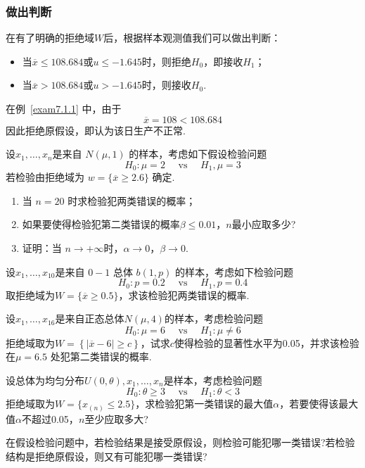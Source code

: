 \subsubsection{做出判断}

在有了明确的拒绝域$W$后，根据样本观测值我们可以做出判断：
\begin{itemize}
	\item 当$\overline{x}\leq 108.684$或$u\leq -1.645$时，则拒绝$H_{0}$，即接收$H_{1}$；
	\item 当$\overline{ x }>108.684$或$u> -1.645$时，则接收$H_{0}$.
\end{itemize}

在例~\ref{exam7.1.1} 中，由于
\[\overline { x } = 108 < 108.684\]
因此拒绝原假设，即认为该日生产不正常.
\begin{xiti}
	\item 设$x_1,\dotsc ,x_n$是来自 $N(\mu ,1)$ 的样本，考虑如下假设检验问题
	\[H _ { 0 } : \mu = 2 \quad \text { vs } \quad H _ { 1 } , \mu = 3\]
	若检验由拒绝域为 $w = \{ \overline { x } \geq 2.6 \}$ 确定.
	\begin{enumerate}
		\item 当 $n=20$ 时求检验犯两类错误的概率；
		\item 如果要使得检验犯第二类错误的概率$\beta \leq 0.01$，$n$最小应取多少?
		
		\item 证明：当 $n\rightarrow +\infty $时，$\alpha \rightarrow  0$，$\beta \rightarrow  0$.
	\end{enumerate}
	\item 设$x_1,\dotsc ,x_{10}$是来自 $0-1$ 总体 $b(1,p)$ 的样本，考虑如下检验问题
	\[H _ { 0 } : p = 0.2 \quad \text { vs } \quad H _ { 1 } , p = 0.4\]
	取拒绝域为$W = \{ \overline { x } \geq 0.5 \}$，求该检验犯两类错误的概率.
	
	\item 设$x _ { 1 } , \dotsc , x _ { 16 }$是来自正态总体$N(\mu,4)$的样本，考虑检验问题
	\[H _ { 0 } : \mu = 6 \quad \text { vs } \quad H _ { 1 } : \mu \neq 6\]
	拒绝域取为$W=\left\{\left|\overline{x}-6\right|\geq c\right\}$，试求$c$使得检验的显著性水平为0.05，并求该检验在$\mu =6.5$ 处犯第二类错误的概率.
	
	\item 设总体为均匀分布$U ( 0 , \theta ) , x _ { 1 } , \dotsc , x _ { n }$是样本，考虑检验问题
	\[H _ { 0 } : \theta \geq 3 \quad \text { vs } \quad H _ { 1 } : \theta < 3\]
	拒绝域取为$W = \{ x _ { ( n ) } \leq 2.5 \}$，求检验犯第一类错误的最大值$\alpha$，若要使得该最大值$\alpha$不超过0.05，$n$至少应取多大?
	
	\item 在假设检验问题中，若检验结果是接受原假设，则检验可能犯哪一类错误?若检验结构是拒绝原假设，则又有可能犯哪一类错误?
		
\end{xiti}


